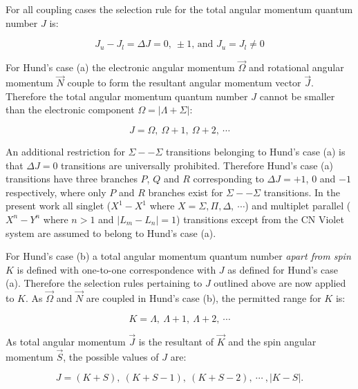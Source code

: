 \par

For all coupling cases the selection rule for the total angular momentum quantum number $J$ is:

\begin{equation}
 J_u - J_l = \Delta J = 0,~\pm1 \text{, and } J_u = J_l \neq 0 \label{eq:delta_J_rules}
\end{equation}


For Hund's case (a) the electronic angular momentum $\vec{\Omega}$ and rotational angular momentum $\vec{N}$ couple to form the resultant angular momentum vector $\vec{J}$.
Therefore the total angular momentum quantum number $J$ cannot be smaller than the electronic component $\Omega = | \Lambda + \Sigma |$:

\begin{equation}
 J = \Omega,~\Omega + 1,~\Omega + 2,~\cdots
\end{equation}

An additional restriction for $\Sigma--\Sigma$ transitions belonging to Hund's case (a) is that $\Delta J=0$ transitions are universally prohibited.
Therefore Hund's case (a) transitions have three branches $P$, $Q$ and $R$ corresponding to $\Delta J = +1$, $0$ and $-1$ respectively, where only $P$ and $R$ branches exist for  $\Sigma--\Sigma$ transitions.
In the present work all singlet ($X^1 - X^1$ where $X = \Sigma, \Pi, \Delta,~\cdots$) and multiplet parallel ($X^n - Y^n$ where $n>1$ and $\left | L_m - L_n \right | =1$) transitions except from the CN Violet system are assumed to belong to Hund's case (a).

\par

For Hund's case (b) a total angular momentum quantum number \emph{apart from spin} $K$ is defined with one-to-one correspondence with $J$ as defined for Hund's case (a).
Therefore the selection rules pertaining to $J$ outlined above are now applied to $K$.
As $\vec{\Omega}$ and $\vec{N}$ are coupled in Hund's case (b), the permitted range for $K$ is:

\begin{equation}
 K = \Lambda,~\Lambda+1,~\Lambda+2,~\cdots
\end{equation}

As total angular momentum $\vec{J}$ is the resultant of $\vec{K}$ and the spin angular momentum $\vec{S}$, the possible values of $J$ are:

\begin{equation}
 J = ( K + S),~(K+S-1),~(K+S-2),~\cdots~, | K - S | .
\end{equation}

